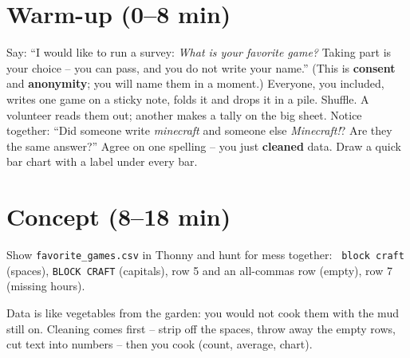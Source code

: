 \section{Warm-up (0--8 min)}
\begin{unplugged}
Say: \enquote{I would like to run a survey: \emph{What is your favorite game?} Taking part is your choice -- you can pass, and you do not write your name.} (This is \textbf{consent} and \textbf{anonymity}; you will name them in a moment.) Everyone, you included, writes one game on a sticky note, folds it and drops it in a pile. Shuffle. A volunteer reads them out; another makes a tally on the big sheet. Notice together: \enquote{Did someone write \emph{minecraft} and someone else \emph{Minecraft!}? Are they the same answer?} Agree on one spelling -- you just \textbf{cleaned} data. Draw a quick bar chart with a label under every bar.
\end{unplugged}

\section{Concept (8--18 min)}

Show \texttt{favorite\_games.csv} in Thonny and hunt for mess together: \texttt{ block craft } (spaces), \texttt{BLOCK CRAFT} (capitals), row 5 and an all-commas row (empty), row 7 (missing hours).

\begin{analogy}
Data is like vegetables from the garden: you would not cook them with the mud still on. Cleaning comes first -- strip off the spaces, throw away the empty rows, cut text into numbers -- then you cook (count, average, chart).
\end{analogy}

